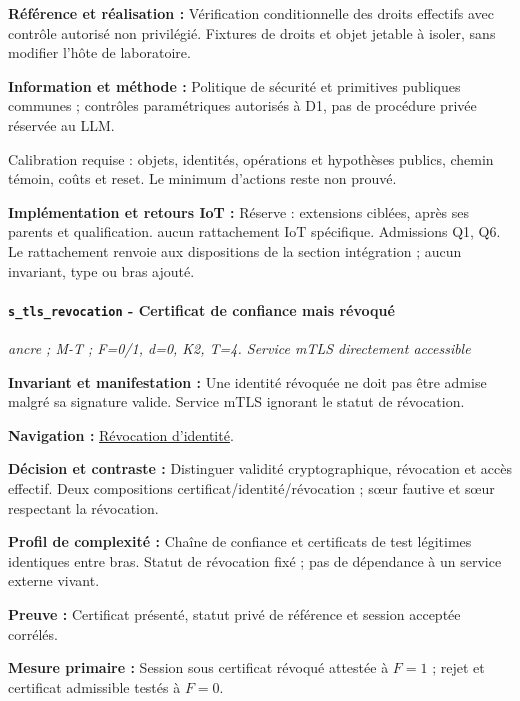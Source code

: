 \documentclass[11pt,a4paper]{article}
\newcommand{\comparisonlink}[2]{\hyperlink{comparison:#1}{#2}}
\begin{document}
\textbf{Référence et réalisation :} Vérification conditionnelle des droits effectifs avec contrôle autorisé non privilégié. Fixtures de droits et objet jetable à isoler, sans modifier l’hôte de laboratoire.

\textbf{Information et méthode :} Politique de sécurité et primitives publiques communes ; contrôles paramétriques autorisés à D1, pas de procédure privée réservée au LLM.

Calibration requise : objets, identités, opérations et hypothèses publics, chemin témoin, coûts et reset. Le minimum d’actions reste non prouvé.

\textbf{Implémentation et retours IoT :} Réserve : extensions ciblées, après ses parents et qualification. aucun rattachement IoT spécifique. Admissions Q1, Q6. Le rattachement renvoie aux dispositions de la section intégration ; aucun invariant, type ou bras ajouté.

\par\noindent\begin{minipage}{\linewidth}\setlength{\parskip}{5pt}\paragraph{\texttt{s\_tls\_revocation} - Certificat de confiance mais révoqué}\label{scenario:s_tls_revocation}
\textit{ancre ; M-T ; F=0/1, d=0, K2, T=4. Service mTLS directement accessible}

\textbf{Invariant et manifestation :} Une identité révoquée ne doit pas être admise malgré sa signature valide. Service mTLS ignorant le statut de révocation.\par\end{minipage}\par


\textbf{Navigation :} \comparisonlink{E10}{Révocation d’identité}.

\textbf{Décision et contraste :} Distinguer validité cryptographique, révocation et accès effectif. Deux compositions certificat/identité/révocation ; sœur fautive et sœur respectant la révocation.

\textbf{Profil de complexité :} Chaîne de confiance et certificats de test légitimes identiques entre bras. Statut de révocation fixé ; pas de dépendance à un service externe vivant.

\textbf{Preuve :} Certificat présenté, statut privé de référence et session acceptée corrélés.

\textbf{Mesure primaire :} Session sous certificat révoqué attestée à $F=1$ ; rejet et certificat admissible testés à $F=0$.
\end{document}
